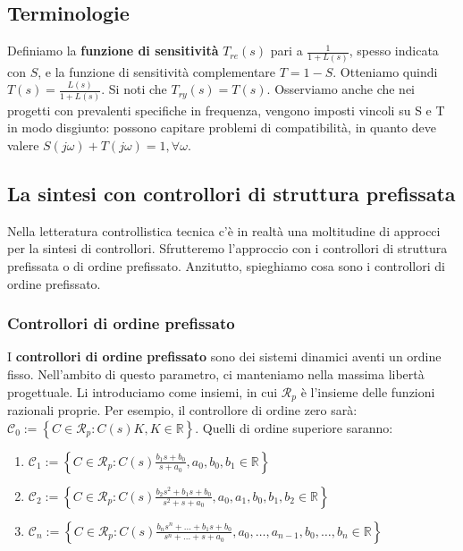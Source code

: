 \documentclass[11pt]{article}
\begin{document}
\subsection{Terminologie}
Definiamo la \textbf{funzione di sensitività} $T_{re}(s)$ pari a $\frac{1}{1+L(s)}$, spesso indicata con $S$, e la funzione di sensitività complementare $T=1-S$. Otteniamo quindi $T(s)=\frac{L(s)}{1+L(s)}$. Si noti che $T_{ry}(s)=T(s)$.
Osserviamo anche che nei progetti con prevalenti specifiche in frequenza, vengono imposti vincoli su S e T in modo disgiunto: possono capitare problemi di compatibilità, in quanto deve valere $S(j\omega)+T(j\omega) = 1, \forall \omega$.
\subsection{La sintesi con controllori di struttura prefissata}
Nella letteratura controllistica tecnica c'è in realtà una moltitudine di approcci per la sintesi di controllori. Sfrutteremo l'approccio con i controllori di struttura prefissata o di ordine prefissato.
Anzitutto, spieghiamo cosa sono i controllori di ordine prefissato.
\subsubsection{Controllori di ordine prefissato}
I \textbf{controllori di ordine prefissato} sono dei sistemi dinamici aventi un ordine fisso. Nell'ambito di questo parametro, ci manteniamo nella massima libertà progettuale. Li introduciamo come insiemi, in cui $\mathcal{R}_p$ è l'insieme delle funzioni razionali proprie. Per esempio, il controllore di ordine zero sarà: $\mathcal{C}_0 :=\left\{C\in\mathcal{R}_p: C(s) K, K\in\mathbb{R}\right\}$.
Quelli di ordine superiore saranno:
\begin{enumerate}
    \item $\mathcal{C}_1 := \left\{C\in\mathcal{R}_p : C(s) \frac{b_1s+b_0}{s+a_0}, a_0, b_0, b_1 \in \mathbb{R}\right\}$
    \item $\mathcal{C}_2 := \left\{C\in\mathcal{R}_p : C(s) \frac{b_2s^2+b_1s+b_0}{s^2+s+a_0}, a_0,a_1, b_0, b_1, b_2 \in \mathbb{R}\right\}$
    \item $\mathcal{C}_n := \left\{C\in\mathcal{R}_p : C(s) \frac{b_ns^n+\dots+b_1s+b_0}{s^n+\dots+s+a_0}, a_0,\dots,a_{n-1}, b_0, \dots, b_n \in \mathbb{R}\right\}$
\end{enumerate}
\end{document}
